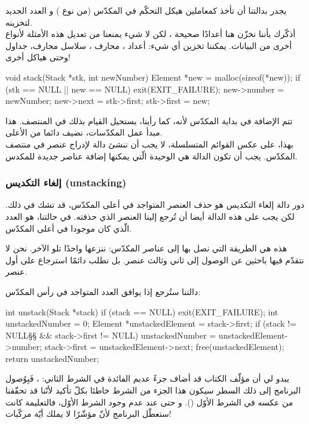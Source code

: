 يجدر بدالتنا
أن تأخذ كمعاملين هيكل التحكّم في المكدّس (من نوع
)
و العدد الجديد لتخزينه.\\
أذكّرك بأننا نخزّن هنا أعدادًا صحيحة
،
لكن لا شيء يمنعنا من تعديل هذه الأمثلة لأنواع أخرى من البيانات. يمكننا تخزين أي شيء: أعداد
،
محارف
،
سلاسل محارف، جداول وحتى هياكل أخرى!

\begin{Csource}
void stack(Stack *stk, int newNumber)
{
	Element *new = malloc(sizeof(*new));
	if (stk == NULL || new == NULL)
	{
		exit(EXIT_FAILURE);
	}
	new->number = newNumber;
	new->next = stk->first;
	stk->first = new;
}
\end{Csource}

تتم الإضافة في بداية المكدّس لأنه، كما رأينا، يستحيل القيام بذلك في المنتصف. هذا مبدأ عمل المكدّسات، نضيف دائما من الأعلى. \\
بهذا، على عكس القوائم المتسلسلة، لا يجب أن ننشئ دالة لإدراج عنصر في منتصف المكدّس. يجب أن تكون الدالة
هي الوحيدة الّتي يمكنها إضافة عناصر جديدة للمكدس.

\subsubsection{إلغاء التكديس (\textenglish{unstacking})}

دور دالة إلغاء التكديس هو حذف العنصر المتواجد في أعلى المكدّس، قد تشك في ذلك. لكن يجب على هذه الدالة أيضا أن تُرجع إلينا العنصر الذي حذفته. في حالتنا، هو العدد الّذي كان موجودا في أعلى المكدّس.

هذه هي الطريقة التي نصل بها إلى عناصر المكدّس: ننزعها واحدًا تلو الآخر. نحن لا نتقدّم فيها باحثين عن الوصول إلى ثاني وثالث عنصر. بل نطلب دائمًا استرجاع على أول عنصر.

دالتنا
ستُرجع إذا
يوافق العدد المتواجد في رأس المكدّس:

\begin{Csource}
int unstack(Stack *stack)
{
	if (stack == NULL)
	{
		exit(EXIT_FAILURE);
	}
	int unstackedNumber = 0;
	Element *unstackedElement = stack->first;
	if (stack != NULL§\footnotemark§ && stack->first != NULL)
	{
		unstackedNumber = unstackedElement->number;
		stack->first = unstackedElement->next;
		free(unstackedElement);
	}
	return unstackedNumber;
}
\end{Csource}

\begin{tcolorbox}[title={\footnotemark[1]ملاحظة مُرَاجِع الكتاب}, colback=orange!20, colframe=orange!70, fontupper=\small, coltitle=white, fonttitle=\normalsize, attach title]
يبدو لي أن مؤلّف الكتاب قد أضاف جزءً عديم الفائدة في الشرط الثاني:
،
فَبِوُصول البرنامج إلى ذلك السطر سيكون هذا الجزء من الشرط خاطئا بكلّ تأكيد لأنّنا قد تحقّقنا من عكسه في الشرط الأوّل 
().
و حتى عند عدم وجود الشرط الأوّل، فالتعليمة
كانت ستعطّل البرنامج لأنّ مؤشّرًا
لا يملك أيّة مركّبات!
\end{tcolorbox}

